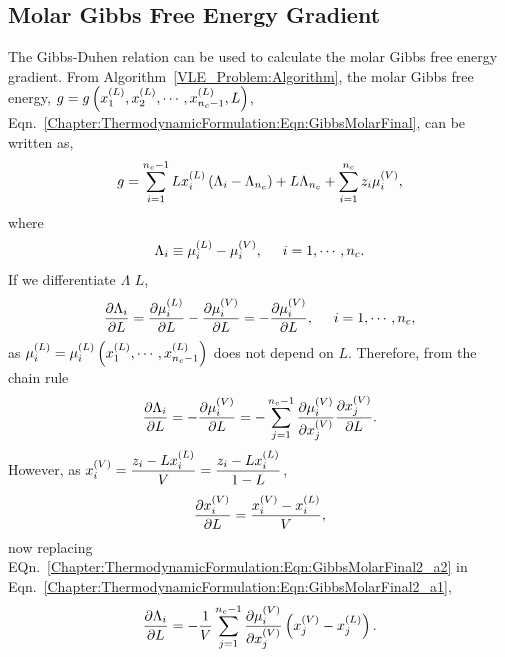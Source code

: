 \subsection{Molar Gibbs Free Energy Gradient}\label{Chapter:ThermodynamicFormulation:Section:GradientGibbs}
The Gibbs-Duhen relation can be used to calculate the molar Gibbs free energy gradient. From Algorithm~\ref{VLE_Problem:Algorithm}, the molar Gibbs free energy, $g=g\left(\mfr[x]{1}{L}, \mfr[x]{2}{L}, \cdots, \mfr[x]{n_{c}-1}{L}, L\right)$, Eqn.~\ref{Chapter:ThermodynamicFormulation:Eqn:GibbsMolarFinal}, can be written as,
\begin{equation}
   g = \summation_{i=1}^{n_{c}-1} L\mfr[x]{i}{L}\left(\Lambda_{i}-\Lambda_{n_{c}}\right) + L\Lambda_{n_{c}} + \summation_{i=1}^{n_{c}} z_{i}\mfr[\mu]{i}{V},\label{Chapter:ThermodynamicFormulation:Eqn:GibbsMolarFinal2}
\end{equation}
where
\begin{displaymath}
   \Lambda_{i} \equiv \mfr[\mu]{i}{L} - \mfr[\mu]{i}{V}, \hspace{.5cm} i=1, \cdots, n_{c}.
\end{displaymath}
If we differentiate $\Lambda$ \wrt $L$,
\begin{displaymath}
    \frc{\partial\Lambda_{i}}{\partial L} = \frc{\partial\mfr[\mu]{i}{L}}{\partial L} - \frc{\partial\mfr[\mu]{i}{V}}{\partial L} = - \frc{\partial\mfr[\mu]{i}{V}}{\partial L}, \hspace{.5cm} i=1, \cdots, n_{c},
\end{displaymath}
as $\mfr[\mu]{i}{L} = \mfr[\mu]{i}{L}\left(\mfr[x]{1}{L}, \cdots, \mfr[x]{n_{c}-1}{L}\right)$ does not depend on $L$. Therefore, from the chain rule
\begin{equation}
    \frc{\partial\Lambda_{i}}{\partial L} = - \frc{\partial\mfr[\mu]{i}{V}}{\partial L} = - \summation_{j=1}^{n_{c}-1} \frc{\partial\mfr[\mu]{i}{V}}{\partial\mfr[x]{j}{V}}\frc{\partial\mfr[x]{j}{V}}{\partial L}.\label{Chapter:ThermodynamicFormulation:Eqn:GibbsMolarFinal2_a1}
\end{equation}
However, as  $\mfr[x]{i}{V} = \frc{z_{i} - L\mfr[x]{i}{L}}{V} = \frc{z_{i} - L\mfr[x]{i}{L}}{1-L}$,
\begin{equation}
   \frc{\partial\mfr[x]{i}{V}}{\partial L} = \frc{\mfr[x]{i}{V}-\mfr[x]{i}{L}}{V},\label{Chapter:ThermodynamicFormulation:Eqn:GibbsMolarFinal2_a2}
\end{equation}
now replacing EQn.~\ref{Chapter:ThermodynamicFormulation:Eqn:GibbsMolarFinal2_a2} in Eqn.~\ref{Chapter:ThermodynamicFormulation:Eqn:GibbsMolarFinal2_a1},
\begin{equation}
   \frc{\partial\Lambda_{i}}{\partial L} = -\frc{1}{V}\summation_{j=1}^{n_{c}-1}\frc{\partial\mfr[\mu]{i}{V}}{\partial\mfr[x]{j}{V}}\left(\mfr[x]{j}{V}-\mfr[x]{j}{L}\right).\label{Chapter:ThermodynamicFormulation:Eqn:GibbsMolarFinal2_a3}
\end{equation}

